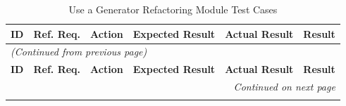 \documentclass[12pt, titlepage]{article}
\begin{document}
\begin{longtable}{c 
  >{\raggedright\arraybackslash}p{1.5cm} 
  >{\raggedright\arraybackslash}p{4.5cm} 
  >{\raggedright\arraybackslash}p{4cm} 
  >{\raggedright\arraybackslash}p{3cm} c}
  \toprule
  \textbf{ID} & \textbf{Ref. Req.} & \textbf{Action} & \textbf{Expected Result} & \textbf{Actual Result} & \textbf{Result} \\ 
  \midrule
  \endfirsthead

  \multicolumn{6}{l}{\textit{(Continued from previous page)}} \\ 
  \toprule
  \textbf{ID} & \textbf{Ref. Req.} & \textbf{Action} & \textbf{Expected Result} & \textbf{Actual Result} & \textbf{Result} \\ 
  \midrule
  \endhead

  \multicolumn{6}{r}{\textit{Continued on next page}} \\
  \endfoot

  \bottomrule
  \caption{Use a Generator Refactoring Module Test Cases}
  \label{table:ugen_refactor_tests}
  \endlastfoot


\end{longtable}
\end{document}
